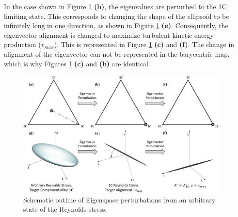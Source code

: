 In the case shown in Figure \ref{fig:pert_vis} \textbf{(b)}, the eigenvalues are perturbed to the 1C limiting state. This corresponds to changing the shape of the ellipsoid to be infinitely long in one direction, as shown in Figure \ref{fig:pert_vis} \textbf{(e)}. Consequently, the eigenvector alignment is changed to maximize turbulent kinetic energy production ($v_{max}$). This is represented in Figure \ref{fig:pert_vis} \textbf{(c)} and \textbf{(f)}. The change in alignment of the eigenvector can not be represented in the barycentric map, which is why Figures \ref{fig:pert_vis} \textbf{(c)} and \textbf{(b)} are identical.

\begin{figure}
    \center
    \includegraphics[width=0.95\textwidth]{images/eig_pert_1c.png}
    \caption{Schematic outline of Eigenspace perturbations from an arbitrary state of the Reynolds stress. \label{fig:pert_vis}}
\end{figure}

